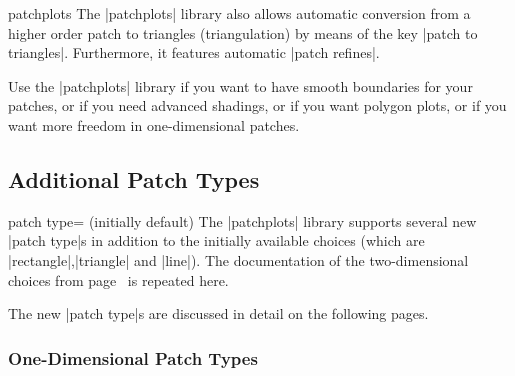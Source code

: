 {\begin{pgfplotslibrary}{patchplots}
The |patchplots| library also allows automatic conversion from a higher order
patch to triangles (triangulation) by means of the key |patch to triangles|.
Furthermore, it features automatic |patch refines|.

Use the |patchplots| library if you want to have smooth boundaries for your
patches, or if you need advanced shadings, or if you want polygon plots, or if
you want more freedom in one-dimensional patches.


\subsection{Additional Patch Types}

%
\begin{pgfplotskey}{patch type= (initially default)%
}
    The |patchplots| library supports several new |patch type|s in addition to
    the initially available choices (which are |rectangle|,|triangle| and
    |line|). The documentation of the two-dimensional choices from
    page~\pageref{key:patch:type} is repeated here.

    The new |patch type|s are discussed in detail on the following pages.
\end{pgfplotskey} %


\subsubsection{One-Dimensional Patch Types}


\end{pgfplotslibrary}}
